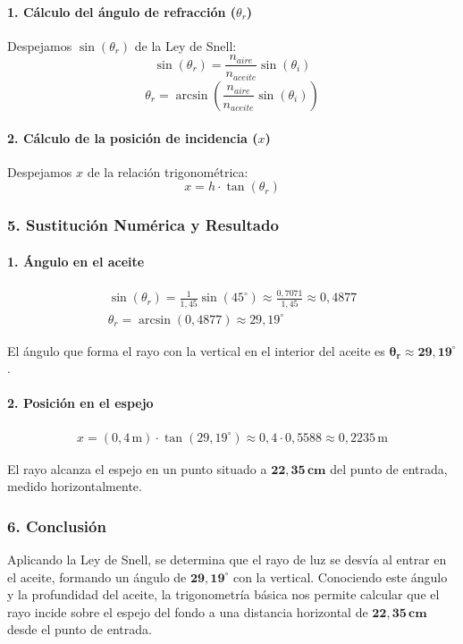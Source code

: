 \paragraph{1. Cálculo del ángulo de refracción ($\theta_r$)}
Despejamos $\sin(\theta_r)$ de la Ley de Snell:
$$ \sin(\theta_r) = \frac{n_{aire}}{n_{aceite}} \sin(\theta_i) $$
$$ \theta_r = \arcsin\left(\frac{n_{aire}}{n_{aceite}} \sin(\theta_i)\right) $$

\paragraph{2. Cálculo de la posición de incidencia ($x$)}
Despejamos $x$ de la relación trigonométrica:
$$ x = h \cdot \tan(\theta_r) $$

\subsubsection*{5. Sustitución Numérica y Resultado}
\paragraph{1. Ángulo en el aceite}
\begin{gather}
    \sin(\theta_r) = \frac{1}{1,45} \sin(45^\circ) \approx \frac{0,7071}{1,45} \approx 0,4877 \\
    \theta_r = \arcsin(0,4877) \approx 29,19^\circ
\end{gather}
\begin{cajaresultado}
El ángulo que forma el rayo con la vertical en el interior del aceite es $\boldsymbol{\theta_r \approx 29,19^\circ}$.
\end{cajaresultado}

\paragraph{2. Posición en el espejo}
\begin{gather}
    x = (0,4 \, \text{m}) \cdot \tan(29,19^\circ) \approx 0,4 \cdot 0,5588 \approx 0,2235 \, \text{m}
\end{gather}
\begin{cajaresultado}
El rayo alcanza el espejo en un punto situado a $\boldsymbol{22,35 \, \textbf{cm}}$ del punto de entrada, medido horizontalmente.
\end{cajaresultado}

\subsubsection*{6. Conclusión}
\begin{cajaconclusion}
Aplicando la Ley de Snell, se determina que el rayo de luz se desvía al entrar en el aceite, formando un ángulo de $\mathbf{29,19^\circ}$ con la vertical. Conociendo este ángulo y la profundidad del aceite, la trigonometría básica nos permite calcular que el rayo incide sobre el espejo del fondo a una distancia horizontal de $\mathbf{22,35 \, cm}$ desde el punto de entrada.
\end{cajaconclusion}

